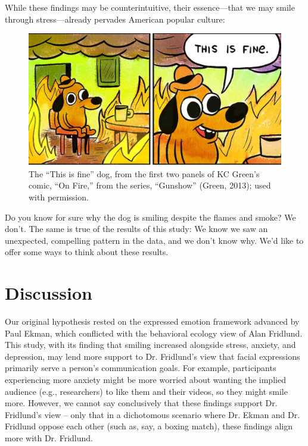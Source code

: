 \documentclass[authordate, empirical]{jote-new-article}
\begin{document}
While these findings may be counterintuitive, their essence—that we may smile through stress—already pervades American popular culture:







\begin{figure}[h]
  \includegraphics[width=\linewidth]{media/image5.jpeg}

  \caption{The “This is fine” dog, from the first two panels of KC Green's comic, “On Fire,” from the series, “Gunshow” (Green, 2013); used with permission.}

  \label{fig:rId12}


\end{figure}










Do you know for sure why the dog is smiling despite the flames and smoke? We don't. The same is true of the results of this study: We know we saw an unexpected, compelling pattern in the data, and we don't know why. We'd like to offer some ways to think about these results.







\section{Discussion}







Our original hypothesis rested on the expressed emotion framework advanced by Paul Ekman, which conflicted with the behavioral ecology view of Alan Fridlund. This study, with its finding that smiling increased alongside stress, anxiety, and depression, may lend more support to Dr. Fridlund's view that facial expressions primarily serve a person's communication goals. For example, participants experiencing more anxiety might be more worried about wanting the implied audience (e.g., researchers) to like them and their videos, so they might smile more. However, we cannot say conclusively that these findings support Dr. Fridlund's view -- only that in a dichotomous scenario where Dr. Ekman and Dr. Fridlund oppose each other (such as, say, a boxing match), these findings align more with Dr. Fridlund.
\end{document}
